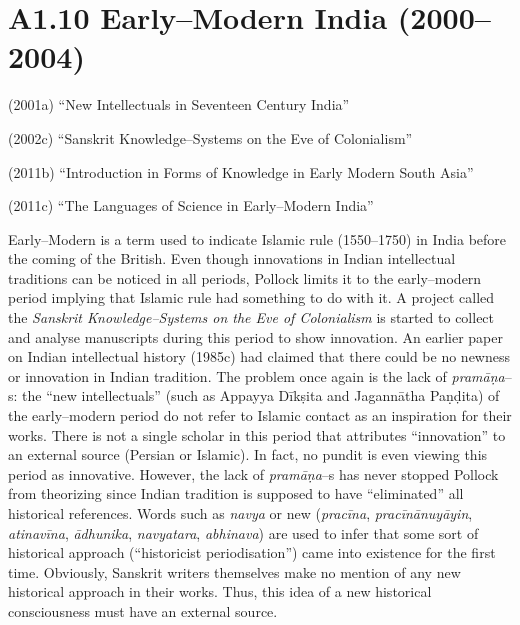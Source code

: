 {{\vspace{-.3cm}

\section*{A1.10 Early–Modern India (2000–2004)}

\vspace {-.2cm}

(2001a) “New Intellectuals in Seventeen Century India”

(2002c) “Sanskrit Knowledge–Systems on the Eve of Colonialism”

(2011b) “Introduction in Forms of Knowledge in Early Modern South Asia”

(2011c) “The Languages of Science in Early–Modern India”

Early–Modern is a term used to indicate Islamic rule (1550–1750) in India before the coming of the British. Even though innovations in Indian intellectual traditions can be noticed in all periods, Pollock limits it to the early–modern period implying that Islamic rule had something to do with it. A project called the \textit{Sanskrit Knowledge–Systems on the Eve of Colonialism} is started to collect and analyse manuscripts during this period to show innovation. An earlier paper on Indian intellectual history (1985c) had claimed that there could be no newness or innovation in Indian tradition. The problem once again is the lack of \textit{pramāṇa}–s: the “new intellectuals” (such as Appayya Dīkṣita and Jagannātha Paṇḍita) of the early–modern period do not refer to Islamic contact as an inspiration for their works. There is not a single scholar in this period that attributes “innovation” to an external source (Persian or Islamic). In fact, no pundit is even viewing this period as innovative. However, the lack of \textit{pramāṇa}–s has never stopped Pollock from theorizing since Indian tradition is supposed to have “eliminated” all historical references. Words such as \textit{navya} or new (\textit{pracīna},\textit{ pracīnānuyāyin},\textit{ atinavīna},\textit{ ādhunika},\textit{ navyatara},\textit{ abhinava}) are used to infer that some sort of historical approach (“historicist periodisation”) came into existence for the first time. Obviously, Sanskrit writers themselves make no mention of any new historical approach in their works. Thus, this idea of a new historical consciousness must have an external source.

}}
